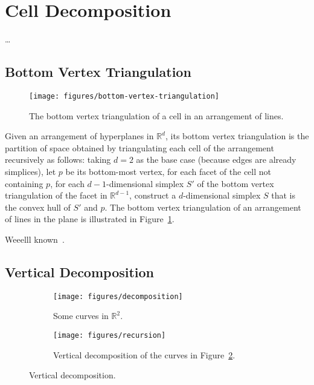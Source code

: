 \section{Cell Decomposition}

\dots

\subsection{Bottom Vertex Triangulation}%
\label{sec:arrangements:triangulation}

\begin{figure}
  \centering{}
  \texttt{[image: figures/bottom-vertex-triangulation]}
  \caption{%
    The bottom vertex triangulation of a cell in an arrangement of lines.%
  }%
  \label{fig:bvt}
\end{figure}

Given an arrangement of hyperplanes in \(\mathbb{R}^d\), its bottom vertex
triangulation is the partition of space obtained by triangulating each cell of
the arrangement recursively as follows: taking \(d=2\) as the base case
(because edges are already simplices),
let \(p\) be its bottom-most vertex,
for each facet of the cell not containing \(p\),
for each \(d-1\)-dimensional simplex \(S'\) of the bottom vertex triangulation
of the facet in \(\mathbb{R}^{d-1}\),
construct a \(d\)-dimensional simplex \(S\) that is the convex hull of
\(S'\) and \(p\).
%
The
bottom vertex triangulation of an arrangement of lines in the plane is illustrated
in Figure~\ref{fig:bvt}.

Weeelll known~\cite{GO04,Cla88}.

\subsection{Vertical Decomposition}%
\label{sec:arrangements:vertical-decomposition}

\begin{figure}
	\centering{}
    \begin{subfigure}[t]{0.5\textwidth}
		\centering
		\texttt{[image: figures/decomposition]}
		\caption{Some curves in $\mathbb{R}^2$.}%
		\label{fig:some-curves-in-R2}
    \end{subfigure}%
    \begin{subfigure}[t]{0.5\textwidth}
		\centering
		\texttt{[image: figures/recursion]}
		\caption{Vertical decomposition of the curves in Figure~\ref{fig:some-curves-in-R2}.}%
    \end{subfigure}
	\caption{Vertical decomposition.}\label{fig:vd}
\end{figure}

